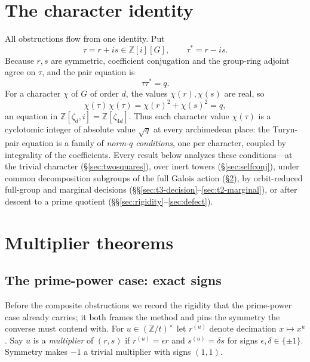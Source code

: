 \documentclass[11pt]{article}
\theoremstyle{plain}
\theoremstyle{definition}
\theoremstyle{remark}
\newcommand{\Z}{\mathbb Z}
\begin{document}
\section{The character identity}\label{sec:character}

All obstructions flow from one identity. Put
\[
  \tau=r+is\in\Z[i][G],\qquad \tau^*=r-is.
\]
Because $r,s$ are symmetric, coefficient conjugation and the group-ring adjoint
agree on $\tau$, and the pair equation is
\begin{equation}\label{eq:tau}
  \tau\tau^*=q.
\end{equation}
For a character $\chi$ of $G$ of order $d$, the values $\chi(r),\chi(s)$ are
real, so
\begin{equation}\label{eq:charnorm}
  \chi(\tau)\,\overline{\chi(\tau)}=\chi(r)^2+\chi(s)^2=q,
\end{equation}
an equation in $\Z[\zeta_d,i]=\Z[\zeta_{4d}]$. Thus each character value
$\chi(\tau)$ is a cyclotomic integer of absolute value $\sqrt q$ at every
archimedean place: the Turyn-pair equation is a family of \emph{norm-$q$
conditions}, one per character, coupled by integrality of the coefficients.
Every result below analyzes these conditions---at the trivial character
(\S\ref{sec:twosquares}), over inert towers (\S\ref{sec:selfconj}), under common
decomposition subgroups of the full Galois action (\S\ref{sec:multiplier}), by
orbit-reduced full-group and marginal decisions
(\S\S\ref{sec:t3-decision}--\ref{sec:t2-marginal}), or after descent to a prime
quotient (\S\S\ref{sec:rigidity}--\ref{sec:defect}).

\section{Multiplier theorems}\label{sec:multiplier}

\subsection{The prime-power case: exact signs}

Before the composite obstructions we record the rigidity that the prime-power
case already carries; it both frames the method and pins the symmetry the
converse must contend with. For $u\in(\Z/t)^\times$ let $r^{(u)}$ denote
decimation $x\mapsto x^u$. Say $u$ is a \emph{multiplier} of $(r,s)$ if
$r^{(u)}=\epsilon r$ and $s^{(u)}=\delta s$ for signs $\epsilon,\delta\in\{\pm1\}$.
Symmetry makes $-1$ a trivial multiplier with signs $(1,1)$.
\end{document}
